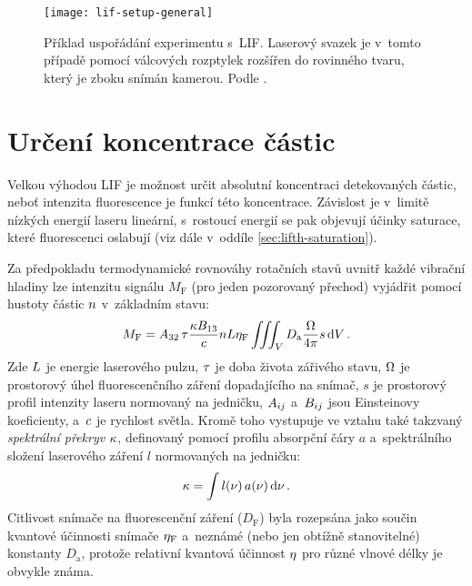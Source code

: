 \begin{figure}[htb]
	\centering
	\texttt{[image: lif-setup-general]}
	\caption{Příklad uspořádání experimentu s~LIF.
		Laserový svazek je v~tomto případě pomocí válcových rozptylek
		rozšířen do rovinného tvaru, který je zboku snímán kamerou.
		Podle \cite{lif-oh}.}
	\label{fig:lifth-setup}
\end{figure}

\section{Určení koncentrace částic}
\label{sec:lifth-concentration}
\providecommand\vol{V}
\providecommand\sensabs{D_\text{a}}
\providecommand\lifsens{D_\text{F}}
\providecommand\rayleighsens{D_\text{R}}
\providecommand\lifsignal{M_\text{F}}
\providecommand\rayleighsignal{M_\text{R}}
\providecommand\lifeff{\qeff_\text{F}}
\providecommand\rayleigheff{\qeff_\text{R}}
\providecommand\rayleighdxsect{\dv{\sigma_\text{R}}{\solidangle}}
\providecommand\rayleighndens{\ndens_\text{R}}
\providecommand\enlaserrayleigh{L_\text{R}}
\providecommand\beamprofile{s}
Velkou výhodou LIF je možnost určit absolutní koncentraci detekovaných částic,
neboť intenzita fluorescence je funkcí této koncentrace.
Závislost je v~limitě nízkých energií laseru lineární,
s~rostoucí energií se pak objevují účinky saturace,
které fluorescenci oslabují (viz dále v~oddíle \ref{sec:lifth-saturation}).

Za předpokladu termodynamické rovnováhy rotačních stavů uvnitř každé
vibrační hladiny lze intenzitu signálu $\lifsignal$ (pro jeden pozorovaný
přechod) vyjádřit pomocí hustoty částic $n$ v~základním stavu:
\begin{equation}
	\label{eq:lifth-lifsignal}
	\lifsignal = \einsteina32\,\lifetime
	\frac{\specoverlap \einsteinb13}{\lightspeed}
	\ndens \enlaser \lifeff
	\iiint_\vol \sensabs \frac{\solidangle}{4\pi} \beamprofile \dd{\vol}.
\end{equation}
Zde $L$ je energie laserového pulzu,
$\tau$ je doba života zářivého stavu,
$\Omega$ je prostorový úhel fluorescenčního záření dopadajícího
na snímač,
$\beamprofile$ je prostorový profil intenzity laseru normovaný na jedničku,
$A_{ij}$ a~$B_{ij}$ jsou Einsteinovy koeficienty,
a~$c$ je rychlost světla.
Kromě toho vystupuje ve vztahu také takzvaný
\emph{spektrální překryv} $\kappa$,
definovaný pomocí profilu absorpční čáry $a$
a~spektrálního složení laserového záření $l$ normovaných na jedničku:
\begin{equation}
	\label{eq:lifth-specoverlap}
	\kappa = \int l(\nu)\,a(\nu) \dd{\nu}.
\end{equation}
Citlivost snímače na fluorescenční záření ($\lifsens$) byla rozepsána
jako součin kvantové účinnosti snímače $\lifeff$ a~neznámé
(nebo jen obtížně stanovitelné) konstanty $\sensabs$,
protože relativní kvantová účinnost $\eta$ pro různé vlnové délky
je obvykle známa.

